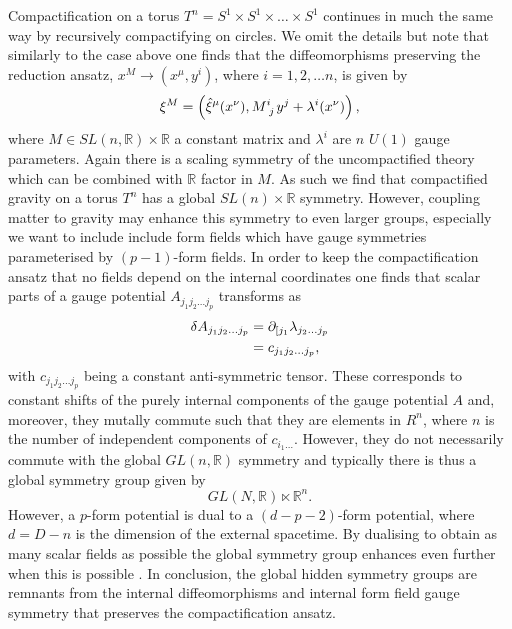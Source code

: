 Compactification on a torus $T^n=S^1\times S^1\times\ldots\times S^1$ continues in much the same way by recursively compactifying on circles. We omit the details but note that similarly to the case above one finds that the diffeomorphisms preserving the reduction ansatz, $x^M\to (x^\mu,y^i)$, where $i=1,2,\ldots n$, is given by 
\begin{equation}
    \xi^M = \left(\hat{\xi}^\mu(x^\nu),\tensor{M}{^i_j}y^j+\lambda^i(x^\nu)\right),
\end{equation}
where $M\in SL(n,\mathbb{R})\times \mathbb{R}$ a constant matrix and $\lambda^i$ are $n$ $U(1)$ gauge parameters. Again there is a scaling symmetry of the uncompactified theory which can be combined with $\mathbb{R}$ factor in $M$. As such we find that compactified gravity on a torus $T^n$ has a global $SL(n)\times\mathbb{R}$ symmetry. However, coupling matter to gravity may enhance this symmetry to even larger groups, especially we want to include include form fields which have gauge symmetries parameterised by $(p-1)$-form fields. In order to keep the compactification ansatz that no fields depend on the internal coordinates one finds that scalar parts of a gauge potential $A_{j_1j_2\ldots j_p}$ transforms as 
\begin{equation}
    \begin{aligned}
    \delta A_{j_1j_2\ldots j_p} &= \partial_{[j_1} \lambda_{j_2\ldots j_{p}}\\
                                &= c_{j_1j_2\ldots j_p},
    \end{aligned}
\end{equation}
with $c_{j_1j_2\ldots j_p}$ being a constant anti-symmetric tensor. These corresponds to constant shifts of the purely internal components of the gauge potential $A$ and, moreover, they mutally commute such that they are elements in $R^n$, where $n$ is the number of independent components of $c_{i_1\ldots}$. However, they do not necessarily commute with the global $GL(n,\mathbb{R})$ symmetry and typically there is thus a global symmetry group given by 
\begin{equation}
    GL(N,\mathbb{R})\ltimes \mathbb{R}^n.
\end{equation}
However, a $p$-form potential is dual to a $(d-p-2)$-form potential, where $d=D-n$ is the dimension of the external spacetime. By dualising to obtain as many scalar fields as possible the global symmetry group enhances even further when this is possible \cite{Cremmer:1997ct}. In conclusion, the global hidden symmetry groups are remnants from the internal diffeomorphisms and internal form field gauge symmetry that preserves the compactification ansatz. 


